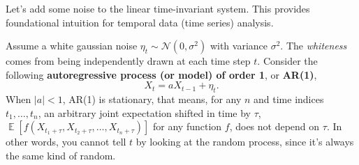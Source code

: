 \documentclass[letterpaper,11pt]{exam}
\DeclareMathOperator*{\E}{\mathbb{E}} %
\DeclareMathOperator*{\var}{var}
\DeclareMathOperator*{\cov}{cov}
\newcounter{homework}
\newcommand{\homework}{\stepcounter{homework}\textcolor{violet}{\textbf{Homework \thehomework:}~}}
\newcommand{\funfact}{\textbf{Fun Fact:}~}
\begin{document}
\begin{questions}
\newpage

Let's add some noise to the linear time-invariant system.
This provides foundational intuition for temporal data (time series) analysis.

\question Assume a white gaussian noise $\eta_t \sim \mathcal{N}(0, \sigma^2)$ with variance $\sigma^2$.
The \textit{whiteness} comes from being independently drawn at each time step $t$.
Consider the following \textbf{autoregressive process (or model) of order 1}, or \textbf{AR(1)},
\begin{equation}\label{eq:ar1}
    X_t = a X_{t-1} + \eta_t.
\end{equation}
When $|a| < 1$, AR(1) is stationary, that means, for any $n$ and time indices $t_1, \ldots, t_n$, an arbitrary joint expectation shifted in time by $\tau$, $\E[f(X_{t_1+\tau}, X_{t_2+\tau}, \ldots, X_{t_n+\tau})]$ for any function $f$, does not depend on $\tau$.
In other words, you cannot tell $t$ by looking at the random process, since it's always the same kind of random.

\end{questions}
\end{document}
